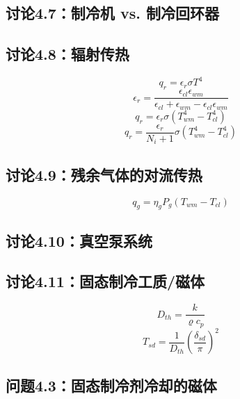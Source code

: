 \subsection{讨论4.7：制冷机 vs. 制冷回环器}


\subsection{讨论4.8：辐射传热}
\begin{equation}%
q_r=\epsilon_r\sigma T^4
\end{equation}
\begin{equation}%
\epsilon_r=\frac{\epsilon_{cl}\epsilon_{wm}}{\epsilon_{cl}+\epsilon_{wm}-\epsilon_{cl}\epsilon_{wm}}
\end{equation}
\begin{equation}%
q_r=\epsilon_r\sigma(T_{wm}^4-T_{cl}^4)
\end{equation}
\begin{equation}%
q_r=\frac{\epsilon_r}{N_i+1}\sigma(T_{wm}^4-T_{cl}^4)
\end{equation}



\subsection{讨论4.9：残余气体的对流传热}

\begin{equation}%
q_g=\eta_gP_g(T_{wm}-T_{cl})
\end{equation}



\subsection{讨论4.10：真空泵系统}



\subsection{讨论4.11：固态制冷工质/磁体}
\begin{equation}%
D_{th}=\frac{k}{\varrho c_p}
\end{equation}
\begin{equation}%
T_{sd}=\frac{1}{D_{th}}(\frac{\delta_{sd}}{\pi})^2
\end{equation}


\subsection{问题4.3：固态制冷剂冷却的磁体}

